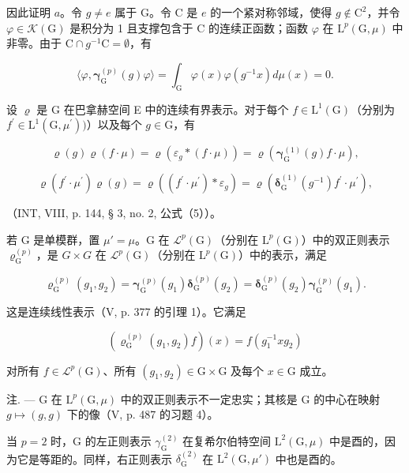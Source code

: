 因此证明 \(a\)。令 \(g \neq e\) 属于 G。令 C 是 \(e\) 的一个紧对称邻域，使得 \(g \notin \mathrm{C}^2\)，并令 \(\varphi \in \mathcal{K}(\mathrm{G})\) 是积分为 1 且支撑包含于 C 的连续正函数；函数 \(\varphi\) 在 \(\mathrm{L}^p(\mathrm{G}, \mu)\) 中非零。由于 \(\mathrm{C} \cap g^{-1}\mathrm{C} = \emptyset\)，有

\[
\langle \varphi , \boldsymbol {\gamma} _ {\mathrm{G}} ^ {(p)} (g) \varphi \rangle = \int_ {\mathrm{G}} \varphi (x) \varphi (g ^ {- 1} x) d \mu (x) = 0.
\]

设 \(\varrho\) 是 G 在巴拿赫空间 E 中的连续有界表示。对于每个 \(f\in \mathrm{L}^1 (\mathrm{G})\)（分别为 \(f^{\prime}\in \mathrm{L}^{1}(\mathrm{G},\mu^{\prime}))\)）以及每个 \(g\in \mathrm{G}\)，有

\[
\varrho (g) \varrho (f \cdot \mu) = \varrho (\varepsilon_ {g} * (f \cdot \mu)) = \varrho (\boldsymbol {\gamma} _ {\mathrm{G}} ^ {(1)} (g) f \cdot \mu),\tag{1}
\]

\[
\varrho (f ^ {\prime} \cdot \mu^ {\prime}) \varrho (g) = \varrho ((f ^ {\prime} \cdot \mu^ {\prime}) * \varepsilon_ {g}) = \varrho (\boldsymbol {\delta} _ {\mathrm{G}} ^ {(1)} (g ^ {- 1}) f ^ {\prime} \cdot \mu ^ {\prime}),\tag{2}
\]

（INT, VIII, p. 144, § 3, no. 2, 公式（5））。

若 G 是单模群，置 \(\mu' = \mu\)。G 在 \(\mathcal{L}^{p}(\mathrm{G})\)（分别在 \(\mathrm{L}^{p}(\mathrm{G})\)）中的双正则表示 \(\varrho_{\mathrm{G}}^{(p)}\)，是 \(G \times G\) 在 \(\mathcal{L}^{p}(\mathrm{G})\)（分别在 \(\mathrm{L}^{p}(\mathrm{G})\)）中的表示，满足

\[
\boldsymbol {\varrho} _ {\mathrm{G}} ^ {(p)} (g _ {1}, g _ {2}) = \boldsymbol {\gamma} _ {\mathrm{G}} ^ {(p)} (g _ {1}) \boldsymbol {\delta} _ {\mathrm{G}} ^ {(p)} (g _ {2}) = \boldsymbol {\delta} _ {\mathrm{G}} ^ {(p)} (g _ {2}) \boldsymbol {\gamma} _ {\mathrm{G}} ^ {(p)} (g _ {1}).
\]

这是连续线性表示（V, p. 377 的引理 1）。它满足

\[
(\boldsymbol {\varrho} _ {\mathrm{G}} ^ {(p)} (g _ {1}, g _ {2}) f) (x) = f (g _ {1} ^ {- 1} x g _ {2})
\]

对所有 \(f \in \mathcal{L}^p(\mathrm{G})\)、所有 \((g_1, g_2) \in \mathrm{G} \times \mathrm{G}\) 及每个 \(x \in \mathrm{G}\) 成立。

注. --- G 在 \(\mathrm{L}^{p}(\mathrm{G},\mu)\) 中的双正则表示不一定忠实；其核是 G 的中心在映射 \(g\mapsto(g,g)\) 下的像（V, p. 487 的习题 4）。

当 \(p = 2\) 时，G 的左正则表示 \(\gamma_{\mathrm{G}}^{(2)}\) 在复希尔伯特空间 \(\mathrm{L}^2 (\mathrm{G},\mu)\) 中是酉的，因为它是等距的。同样，右正则表示 \(\delta_{\mathrm{G}}^{(2)}\) 在 \(\mathrm{L}^2 (\mathrm{G},\mu')\) 中也是酉的。

